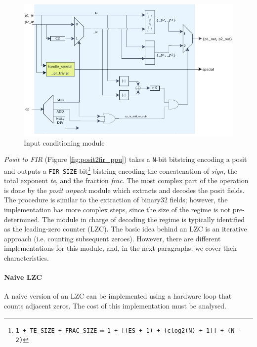 \begin{figure}
    \centering
    \includegraphics[width=.75\textwidth]{figures/input_conditioning.pdf}
    \caption{Input conditioning module}
    \label{fig:input_conditioning_module}
\end{figure}



\textit{Posit to FIR} (Figure \ref{fig:posit2fir_ppu}) takes a \texttt{N}-bit bitstring encoding a posit and outputs a \texttt{FIR\_SIZE}-bit\footnote{\texttt{1 + TE\_SIZE + FRAC\_SIZE} = \texttt{1 + [(ES + 1) + (clog2(N) + 1)] + (N - 2)}} bistring encoding the concatenation of \textit{sign}, the total exponent \textit{te}, and the fraction \textit{frac}.
The most complex part of the operation is done by the \textit{posit unpack} module which extracts and decodes the posit fields. The procedure is similar to the extraction of binary32 fields; however, the implementation has more complex steps, since the size of the regime is not pre-determined.
The module in charge of decoding the regime is typically identified as the leading-zero counter (LZC). The basic idea behind an LZC is an iterative approach (i.e. counting subsequent zeroes). However, there are different implementations for this module, and, in the next paragraphs, we cover their characteristics.

\paragraph{Naive LZC}

A naive version of an LZC can be implemented using a hardware loop that counts adjacent zeros. The cost of this implementation must be analysed.






